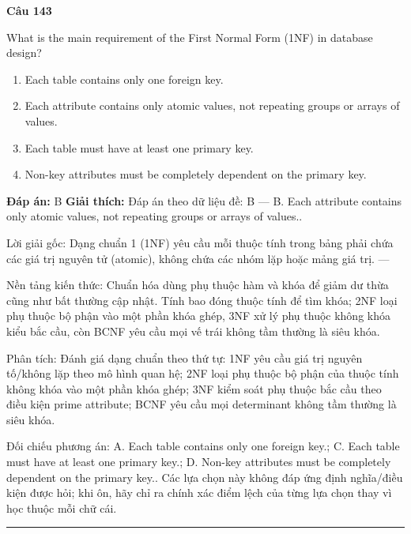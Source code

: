 \documentclass[11pt,a4paper]{article}
\newenvironment{question}[1]{%
  \par\vspace{1em}\noindent\textbf{\large Câu #1}\par\vspace{0.4em}
}{%
  \par\vspace{1em}\hrule\vspace{0.6em}
}
\newenvironment{choices}{%
  \begin{enumerate}[label=\textbf{\Alph*.},leftmargin=2.2em,itemsep=2pt,topsep=3pt]
}{%
  \end{enumerate}
}
\newcommand{\choice}{\item}
\begin{document}
\begin{question}{143}
What is the main requirement of the First Normal Form (1NF) in database design?
\begin{choices}
\choice Each table contains only one foreign key.
\choice Each attribute contains only atomic values, not repeating groups or arrays of values.
\choice Each table must have at least one primary key.
\choice Non-key attributes must be completely dependent on the primary key.
\end{choices}
\textbf{Đáp án:} B
\textbf{Giải thích:} Đáp án theo dữ liệu đề: B — B. Each attribute contains only atomic values, not repeating groups or arrays of values..

Lời giải gốc: Dạng chuẩn 1 (1NF) yêu cầu mỗi thuộc tính trong bảng phải chứa các giá trị nguyên tử (atomic), không chứa các nhóm lặp hoặc mảng giá trị. ---

Nền tảng kiến thức: Chuẩn hóa dùng phụ thuộc hàm và khóa để giảm dư thừa cũng như bất thường cập nhật. Tính bao đóng thuộc tính để tìm khóa; 2NF loại phụ thuộc bộ phận vào một phần khóa ghép, 3NF xử lý phụ thuộc không khóa kiểu bắc cầu, còn BCNF yêu cầu mọi vế trái không tầm thường là siêu khóa.

Phân tích: Đánh giá dạng chuẩn theo thứ tự: 1NF yêu cầu giá trị nguyên tố/không lặp theo mô hình quan hệ; 2NF loại phụ thuộc bộ phận của thuộc tính không khóa vào một phần khóa ghép; 3NF kiểm soát phụ thuộc bắc cầu theo điều kiện prime attribute; BCNF yêu cầu mọi determinant không tầm thường là siêu khóa.

Đối chiếu phương án: A. Each table contains only one foreign key.; C. Each table must have at least one primary key.; D. Non-key attributes must be completely dependent on the primary key.. Các lựa chọn này không đáp ứng định nghĩa/điều kiện được hỏi; khi ôn, hãy chỉ ra chính xác điểm lệch của từng lựa chọn thay vì học thuộc mỗi chữ cái.
\end{question}
\end{document}

